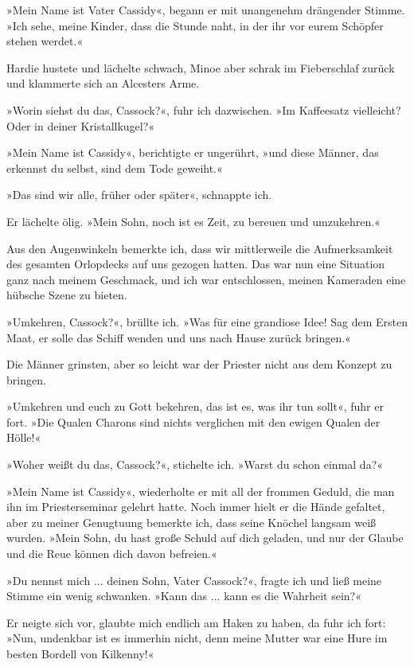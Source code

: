 »Mein Name ist Vater Cassidy«, begann er mit unangenehm drängender
Stimme. »Ich sehe, meine Kinder, dass die Stunde naht, in der ihr
vor eurem Schöpfer stehen werdet.«

Hardie hustete und lächelte schwach, Minoe aber schrak im
Fieberschlaf zurück und klammerte sich an Alcesters Arme.

»Worin siehst du das, Cassock?«, fuhr ich dazwischen. »Im
Kaffeesatz vielleicht? Oder in deiner Kristallkugel?«

»Mein Name ist Cassidy«, berichtigte er ungerührt, »und diese
Männer, das erkennst du selbst, sind dem Tode geweiht.«

»Das sind wir alle, früher oder später«, schnappte ich.

Er lächelte ölig. »Mein Sohn, noch ist es Zeit, zu bereuen und
umzukehren.«

Aus den Augenwinkeln bemerkte ich, dass wir mittlerweile die
Aufmerksamkeit des gesamten Orlopdecks auf uns gezogen hatten. Das
war nun eine Situation ganz nach meinem Geschmack, und ich war
entschlossen, meinen Kameraden eine hübsche Szene zu bieten.

»Umkehren, Cassock?«, brüllte ich. »Was für eine grandiose Idee!
Sag dem Ersten Maat, er solle das Schiff wenden und uns nach Hause
zurück bringen.«

Die Männer grinsten, aber so leicht war der Priester nicht aus dem
Konzept zu bringen.

»Umkehren und euch zu Gott bekehren, das ist es, was ihr tun
sollt«, fuhr er fort. »Die Qualen Charons sind nichts verglichen
mit den ewigen Qualen der Hölle!«

»Woher weißt du das, Cassock?«, stichelte ich. »Warst du schon
einmal da?«

»Mein Name ist Cassidy«, wiederholte er mit all der frommen Geduld,
die man ihn im Priesterseminar gelehrt hatte. Noch immer hielt er
die Hände gefaltet, aber zu meiner Genugtuung bemerkte ich, dass
seine Knöchel langsam weiß wurden. »Mein Sohn, du hast große Schuld
auf dich geladen, und nur der Glaube und die Reue können dich davon
befreien.«

»Du nennst mich ... deinen Sohn, Vater Cassock?«, fragte ich und
ließ meine Stimme ein wenig schwanken. »Kann das ... kann es die
Wahrheit sein?«

Er neigte sich vor, glaubte mich endlich am Haken zu haben, da fuhr
ich fort: »Nun, undenkbar ist es immerhin nicht, denn meine Mutter
war eine Hure im besten Bordell von Kilkenny!«

